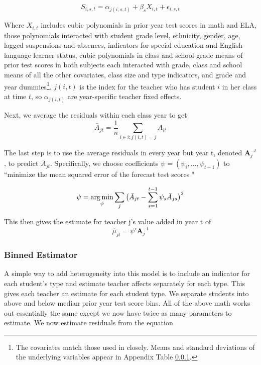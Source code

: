 \documentclass[12pt]{article}
\theoremstyle{definition}
\theoremstyle{definition}
\theoremstyle{definition}
\theoremstyle{definition}
\begin{document}
    \begin{equation}
        S_{i,s,t} = \alpha_{j(i,s,t)} + \beta_s X_{i, t} + \epsilon_{i,s,t}
    \end{equation}

    Where $X_{i, t}$ includes cubic polynomials in prior year test scores in math and ELA, those polynomials interacted with student grade level, ethnicity, gender, age, lagged suspensions and absences, indicators for special education and English language learner status, cubic polynomials in class and school-grade means of prior test scores in both subjects each interacted with grade, class and school means of all the other covariates, class size and type indicators, and grade and year dummies\footnote{The covariates match those used in \citep{chetty2014measuring1} closely. Means and standard deviations of the underlying variables appear in Appendix Table \ref{}.}.  $j(i, t)$ is the index for the teacher who has student $i$ in her class at time $t$, so $\alpha_{j(i, t)}$ are year-specific teacher fixed effects.

    Next, we average the residuals within each class year to get 
    \begin{equation}
        \bar{A}_{jt} = \frac{1}{n} \sum_{i \in {i: j(i, t) = j}} A_{it}
    \end{equation}

    The last step is to use the average residuals in every year but year t, denoted $\mathbf{A}_j^{-t}$, to predict $\bar{A}_{jt} $. Specifically, we choose coefficients $\psi = (\psi_i, ..., \psi_{t-1})$ to ``minimize the mean squared error of the forecast test scores \citep{chetty2014measuring1}"

    \begin{equation}
        \psi = \operatorname*{arg\,min}_{\psi} \sum_j \big(  \bar{A}_{jt} - \sum_{s = 1}^{t-1} \psi_s \bar{A}_{js} \big)^2
    \end{equation}

    This then gives the estimate for teacher j's value added in year t of 
    \begin{equation}
        \hat{\mu}_{jt} = \psi'\mathbf{A}_j^{-t}
    \end{equation}

    \subsubsection{Binned Estimator}
    A simple way to add heterogeneity into this model is to include an indicator for each student's type and estimate teacher affects separately for each type. This gives each teacher an estimate for each student type. We separate students into above and below median prior year test score bins. All of the above math works out essentially the same except we now have twice as many parameters to estimate. We now estimate residuals from the equation
\end{document}
